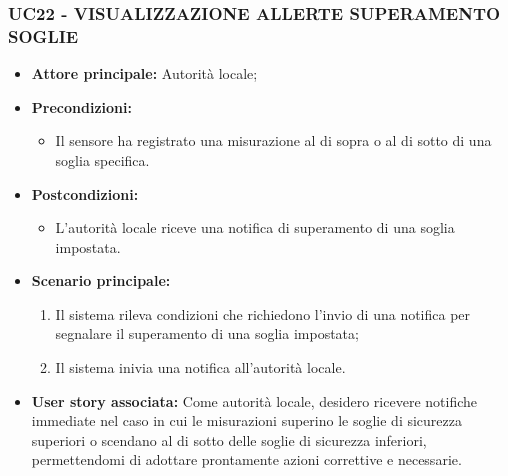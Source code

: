 \subsubsection{UC22 - VISUALIZZAZIONE ALLERTE SUPERAMENTO SOGLIE}
\begin{itemize}
      \item \textbf{Attore principale:} Autorità locale;
      \item \textbf{Precondizioni:}
            \begin{itemize}
                  \item Il sensore ha registrato una misurazione al di sopra o al di sotto di una soglia specifica.
            \end{itemize}
      \item \textbf{Postcondizioni:}
            \begin{itemize}
                  \item  L'autorità locale riceve una notifica di superamento di una soglia impostata.
            \end{itemize}
      \item \textbf{Scenario principale:}
            \begin{enumerate}
                  \item  Il sistema rileva condizioni che richiedono l'invio di una notifica per segnalare il superamento di una soglia impostata;
                  \item Il sistema inivia una notifica all'autorità locale.
            \end{enumerate}
      \item \textbf{User story associata:}
      Come autorità locale, desidero ricevere notifiche immediate nel caso in cui le misurazioni superino le soglie di sicurezza superiori o scendano al di sotto delle soglie di sicurezza inferiori, permettendomi di adottare prontamente azioni correttive e necessarie.
\end{itemize}